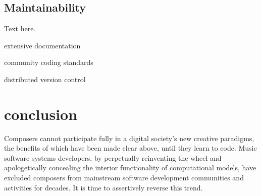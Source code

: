 \documentclass{article}
\begin{document}
\subsection{Maintainability}

Text here.

extensive documentation

community coding standards

distributed version control

\section{conclusion} \label{sec:conclusion}

Composers cannot participate fully in a digital society's new creative
paradigms, the benefits of which have been made clear above, until they learn
to code. Music software systems developers, by perpetually reinventing the
wheel and apologetically concealing the interior functionality of computational
models, have excluded composers from mainstream software development
communities and activities for decades. It is time to assertively reverse this
trend.


\end{document}
